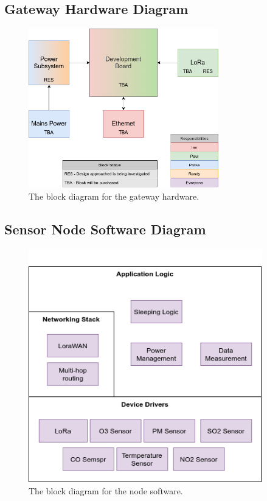 \documentclass[titlepage, 11pt, letterpaper]{article}
\begin{document}
\subsection{Gateway Hardware Diagram}
\begin{figure}[H]
    \centering
    \includegraphics[width=3.25in]{"./hwGatewayBD.png"} 
    \caption{The block diagram for the gateway hardware.}
    \label{fig:hwBaseStationBD}
\end{figure}

\subsection{Sensor Node Software Diagram}
\begin{figure}[H]
    \centering
    \includegraphics[width=4in]{"./swNodeBD.png"} 
    \caption{The block diagram for the node software.}
    \label{fig:swNodeBD}
\end{figure}
\end{document}
